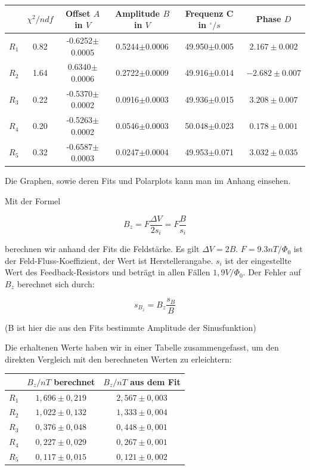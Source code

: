 \begin{tabular}[H]{| c | c | c | c | c | c |} \hline
 & $\chi^2 / ndf$ & Offset $A$ in $V$ & Amplitude $B$ in $V$ & Frequenz C in $^\circ/s$ & Phase $D$ \\ 
\hline
$R_1$ & 0.82 & -0.6252$\pm$0.0005 & 0.5244$\pm$0.0006 & 49.950$\pm$0.005 & $2.167 \pm 0.002$\\
$R_2$ & 1.64 & 0.6340$\pm$0.0006 & 0.2722$\pm$0.0009 & 49.916$\pm$0.014 & $-2.682 \pm 0.007$\\
$R_3$ & 0.22 & -0.5370$\pm$0.0002 & 0.0916$\pm$0.0003 & 49.936$\pm$0.015 & $3.208 \pm 0.007$\\
$R_4$ & 0.20 & -0.5263$\pm$0.0002 & 0.0546$\pm$0.0003 & 50.048$\pm$0.023 & $0.178 \pm 0.001$\\
$R_5$ & 0.32 & -0.6587$\pm$0.0003 & 0.0247$\pm$0.0004 & 49.953$\pm$0.071 & $3.032 \pm 0.035$\\ \hline
\end{tabular}

Die Graphen, sowie deren Fits und Polarplots kann man im Anhang einsehen.

Mit der Formel 

$$ B_z = F \frac{\Delta V}{2s_i} = F\frac{B}{s_i} $$

berechnen wir anhand der Fits die Feldstärke. Es gilt $\Delta V = 2B$. $F = 9.3 nT / \Phi_0$ ist der Feld-Fluss-Koeffizient, der Wert ist Herstellerangabe. $s_i$ ist der eingestellte Wert des Feedback-Resistors und beträgt in allen Fällen $1,9 V/ \Phi_0$. Der Fehler auf $B_z$ berechnet sich durch:

$$ s_{B_z} = B_z\frac{s_B}{B} $$

(B ist hier die aus den Fits bestimmte Amplitude der Sinusfunktion)
 
Die erhaltenen Werte haben wir in einer Tabelle zusammengefasst, um den direkten Vergleich mit den berechneten Werten zu erleichtern:

\begin{center}
\begin{tabular}[H]{| c | c | c |} \hline
 & $B_z / nT$ berechnet & $B_z / nT$ aus dem Fit\\ \hline \hline
 $R_1$ & $1,696 \pm 0,219$ & $2,567\pm 0,003$\\
 $R_2$ & $1,022 \pm 0,132$ & $1,333\pm 0,004$\\
 $R_3$ & $0,376 \pm 0,048$ & $0,448\pm 0,001$\\
 $R_4$ & $0,227 \pm 0,029$ & $0,267\pm 0,001$\\
 $R_5$ & $0,117 \pm 0,015$ & $0,121\pm 0,002$\\ \hline
 \end{tabular}
 \end{center}
 

